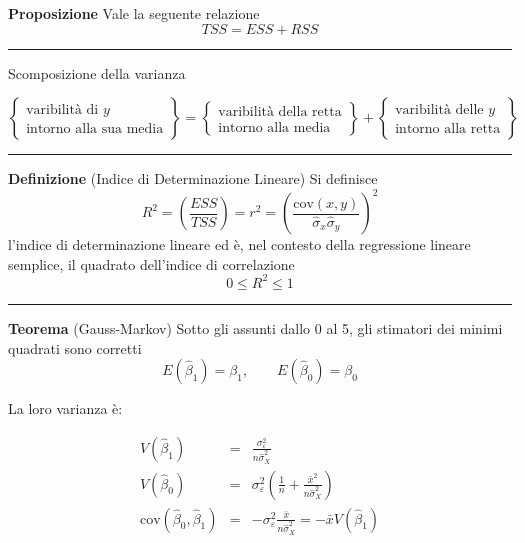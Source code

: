 \documentclass[
  11pt,
]{book}
\theoremstyle{mytheoremstyle}
\theoremstyle{mydefstyle}
\begin{document}
\textbf{Proposizione}
Vale la seguente relazione
\[TSS = ESS + RSS\]

\begin{center}\rule{0.5\linewidth}{0.5pt}\end{center}

Scomposizione della varianza

\[
\left\{\begin{array}{cc}
\text{varibilità di $y$}\\
\text{intorno alla sua media}
\end{array}\right\} =
\left\{\begin{array}{cc}
\text{varibilità della retta}\\
\text{intorno alla media}
\end{array}\right\} +
\left\{\begin{array}{cc}
\text{varibilità delle $y$}\\
\text{intorno alla retta}
\end{array} \right\}
\]

\begin{center}\rule{0.5\linewidth}{0.5pt}\end{center}

\textbf{Definizione} (Indice di Determinazione Lineare)
Si definisce
\[R^2=\left(\frac{ESS}{TSS}\right)=r^2=\left(\frac{\text{cov}(x,y)}{\hat\sigma_x\hat\sigma_y}\right)^2\]
l'indice di determinazione lineare ed è, nel contesto della regressione lineare semplice, il quadrato dell'indice di correlazione
\[0\leq R^2\leq 1\]

\begin{center}\rule{0.5\linewidth}{0.5pt}\end{center}

\textbf{Teorema} (Gauss-Markov)
Sotto gli assunti dallo 0 al 5,
gli stimatori dei minimi quadrati sono corretti
\[E(\hat\beta_1)=\beta_1,\qquad E(\hat\beta_0)=\beta_0\]

La loro varianza è:

\begin{eqnarray*}
    V(\hat\beta_{1}) &=& \frac{\sigma_{\varepsilon}^{2}} {n \hat{\sigma}^{2}_{X}} \\
    V(\hat\beta_{0}) &=& \sigma_{\varepsilon}^{2} \left( \frac{1} {n}  +  \frac{\bar{x}^{2}} {n \hat{\sigma}^{2}_{X}} \right)   \\
    \mbox{cov}(\hat\beta_{0}, \hat\beta_{1}) &=& - \sigma_{\varepsilon}^{2} \frac{\bar{x}} {n \hat{\sigma}^{2}_{X}}
 =  - \bar{x} V(\hat\beta_{1})
\end{eqnarray*}
\end{document}

